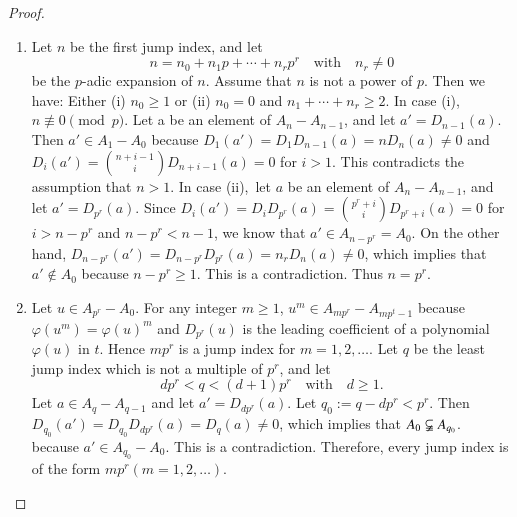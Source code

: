 \begin{proof}
\begin{enumerate}
\renewcommand{\labelenumi}{(\theenumi)}
\item Let $n$ be the first jump index, and let
$$
n=n_{0}+n_{1}p+\cdots+n_{r}p^{r}\quad\text{with}\quad n_{r}\neq 0
$$
be the $p$-adic expansion of $n$. Assume that $n$ is not a power of
$p$. Then we have: Either (i) $n_{0}\geq 1$ or (ii) $n_{0}=0$ and
$n_{1}+\cdots+n_{r}\geq 2$. In case (i), $n\nequiv 0 \pmod{p}$. Let a
be an element of $A_{n}-A_{n-1}$, and let $a'=D_{n-1}(a)$. Then $a'\in
A_{1}-A_{0}$ because $D_{1}(a')=D_{1}D_{n-1}(a)=nD_{n}(a)\neq 0$ and
$D_{i}(a')=\binom{n+i-1}{i}D_{n+i-1}(a)=0$ for $i>1$. This contradicts
the assumption that $n>1$. In case (ii),\pageoriginale\ 
let $a$ be an element of
$A_{n}-A_{n-1}$, and let $a'=D_{p^{r}}(a)$. Since
$D_{i}(a')=D_{i}D_{p^{r}}(a)=\binom{p^{r}+i}{i}D_{p^{r}+i}(a)=0$ for
$i>n-p^{r}$ and $n-p^{r}<n-1$, we know that $a'\in
A_{n-p^{r}}=A_{0}$. On the other hand,
$D_{n-p^{r}}(a')=D_{n-p^{r}}D_{p^{r}}(a)=n_{r}D_{n}(a)\neq 0$, which
implies that $a'\not\in A_{0}$ because $n-p^{r}\geq 1$. This is a
contradiction. Thus $n=p^{r}$. 

\item Let $u\in A_{p^{r}}-A_{0}$. For any integer $m\geq 1$,
  $u^{m}\in A_{mp^{r}}-A_{mp^{t}-1}$ because
  $\varphi(u^{m})=\varphi(u)^{m}$ and $D_{p^{r}}(u)$ is the leading
  coefficient of a polynomial $\varphi(u)$ in $t$. Hence $mp^{r}$ is a
  jump index for $m=1,2,\ldots$. Let $q$ be the least jump index which
  is not a multiple of $p^{r}$, and let
$$
dp^{r}<q<(d+1)p^{r}\quad\text{with}\quad d \geq 1.
$$
Let $a\in A_{q}-A_{q-1}$ and let $a'=D_{dp^{r}}(a)$. Let
$q_{0}:=q-dp^{r}<p^{r}$. Then
$D_{q_{0}}(a')=D_{q_{0}}D_{dp^{r}}(a)=D_{q}(a)\neq 0$, which implies
that $A_{0}\varsubsetneqq A_{q_{0}}$. because $a'\in
A_{q_{0}}-A_{0}$. This is a contradiction. Therefore, every jump index
is of the form $mp^{r}(m=1,2,\ldots)$.
\end{enumerate}
\end{proof}

